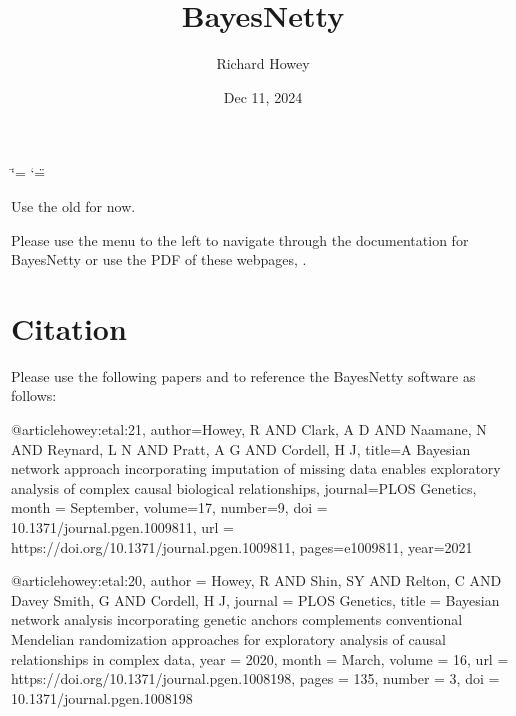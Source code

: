 \documentclass[letterpaper,10pt,english]{sphinxmanual}
\title{BayesNetty}
\date{Dec 11, 2024}
\author{Richard Howey}
\begin{document}
\ifdefined\shorthandoff
  \ifnum\catcode`\=\string=\active\shorthandoff{=}\fi
  \ifnum\catcode`\"=\active{}\fi
\fi

\pagestyle{empty}
\sphinxmaketitle
\pagestyle{plain}
\sphinxtableofcontents
\pagestyle{normal}
\label{\detokenize{index::doc}}


\sphinxAtStartPar
{} Use the old  for now.

\sphinxAtStartPar
Please use the menu to the left to navigate through the documentation for BayesNetty or use the PDF of these webpages, .


\chapter{Citation}
\label{\detokenize{index:citation}}
\sphinxAtStartPar
Please use the following papers  and  to reference the BayesNetty software as follows:

\begin{sphinxVerbatim}[commandchars=\\\{\}]
@article\PYGZob{}howey:etal:21,
author=\PYGZob{}Howey, R AND Clark, A D AND Naamane, N AND Reynard, L N AND Pratt, A G AND Cordell, H J\PYGZcb{},
title=\PYGZob{}\PYGZob{}A Bayesian network approach incorporating imputation of missing data enables exploratory analysis of complex causal biological relationships\PYGZcb{}\PYGZcb{},
journal=\PYGZob{}PLOS Genetics\PYGZcb{},
month = \PYGZob{}September\PYGZcb{},
volume=\PYGZob{}17\PYGZcb{},
number=\PYGZob{}9\PYGZcb{},
doi = \PYGZob{}10.1371/journal.pgen.1009811\PYGZcb{},
url = \PYGZob{}https://doi.org/10.1371/journal.pgen.1009811\PYGZcb{},
pages=\PYGZob{}e1009811\PYGZcb{},
year=\PYGZob{}2021\PYGZcb{}\PYGZcb{}

@article\PYGZob{}howey:etal:20,
author = \PYGZob{}Howey, R AND Shin, S\PYGZhy{}Y AND Relton, C AND Davey Smith, G AND Cordell, H J\PYGZcb{},
journal = \PYGZob{}PLOS Genetics\PYGZcb{},
title = \PYGZob{}Bayesian network analysis incorporating genetic anchors complements conventional Mendelian randomization approaches for exploratory analysis of causal relationships in complex data\PYGZcb{},
year = \PYGZob{}2020\PYGZcb{},
month = \PYGZob{}March\PYGZcb{},
volume = \PYGZob{}16\PYGZcb{},
url = \PYGZob{}https://doi.org/10.1371/journal.pgen.1008198\PYGZcb{},
pages = \PYGZob{}1\PYGZhy{}35\PYGZcb{},
number = \PYGZob{}3\PYGZcb{},
doi = \PYGZob{}10.1371/journal.pgen.1008198\PYGZcb{}\PYGZcb{}
\end{sphinxVerbatim}
\end{document}
